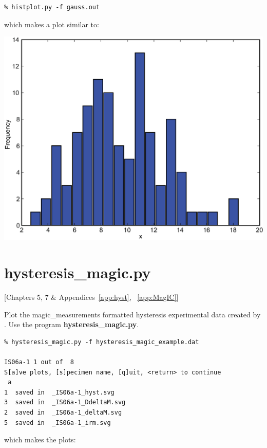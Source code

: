 \documentclass[11pt]{book}
\begin{document}
{{{\begin{verbatim}
% histplot.py -f gauss.out
\end{verbatim}

\noindent  which makes a plot similar to:

  \includegraphics[width=10 cm]{EPSfiles/hist.eps}

\section {\bf hysteresis\_magic.py} [Chapters 5, 7  \& Appendices~\ref{app:hyst}, ~\ref{app:MagIC}]

Plot the magic\_measurements formatted hysteresis experimental data  created by .   Use the program  {\bf hysteresis\_magic.py}.   

\begin{verbatim}
% hysteresis_magic.py -f hysteresis_magic_example.dat

IS06a-1 1 out of  8
S[a]ve plots, [s]pecimen name, [q]uit, <return> to continue
 a
1  saved in  _IS06a-1_hyst.svg
3  saved in  _IS06a-1_DdeltaM.svg
2  saved in  _IS06a-1_deltaM.svg
5  saved in  _IS06a-1_irm.svg
\end{verbatim}

\noindent which makes the plots:


}}}
\end{document}
